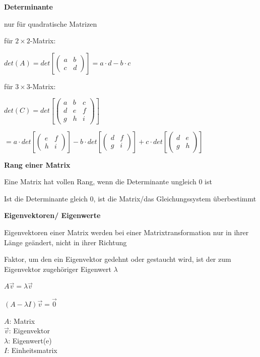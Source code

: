 \textbf{Determinante}

nur für quadratische Matrizen

für $2 \times 2$-Matrix:

$\displaystyle{
    det(A) = det\left[
        \begin{pmatrix}
            a & b\\
            c & d
        \end{pmatrix}
    \right] = 
    a \cdot d - b\cdot c
}$

für $3 \times 3$-Matrix:

$\displaystyle{
    det(C) = det\left[
        \begin{pmatrix}
            a & b & c\\
            d & e & f\\
            g & h & i
        \end{pmatrix}
    \right]
}$

$\displaystyle{
    = a \cdot det\left[ \begin{pmatrix}
        e & f\\
        h & i
        \end{pmatrix} \right]
    - b \cdot det\left[ \begin{pmatrix}
        d & f\\
        g & i
        \end{pmatrix} \right]
    + c \cdot det\left[ \begin{pmatrix}
        d & e\\
        g & h
        \end{pmatrix} \right]
}$

\textbf{Rang einer Matrix}

Eine Matrix hat vollen Rang, wenn die Determinante ungleich 0 ist

Ist die Determinante gleich 0, ist die Matrix/das Gleichungssystem überbestimmt

\textbf{Eigenvektoren/ Eigenwerte}

Eigenvektoren einer Matrix werden bei einer Matrixtransformation nur in ihrer Länge geändert,
nicht in ihrer Richtung

Faktor, um den ein Eigenvektor gedehnt oder gestaucht wird, ist der zum Eigenvektor zugehöriger
Eigenwert $\lambda$

$\displaystyle{
    A \vec{v} = \lambda \vec{v}
}$

$\displaystyle{
    (A - \lambda I) \vec{v} = \vec{0}
}$

$A$: Matrix\\
$\vec{v}$: Eigenvektor\\
$\lambda$: Eigenwert(e)\\
$I$: Einheitsmatrix


